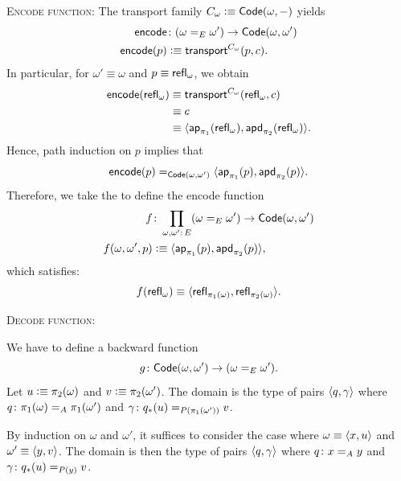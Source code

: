 \textsc{Encode function:}
The transport family\/ $C_\omega\mathrel{\vcentcolon}\equiv\mathsf{Code}(\omega,{\mathord-})$ yields
\begin{align*}
    \fun{encode}&\colon(\omega\eq{E}\omega') \to \fun{Code}(\omega,\omega')\\
    \fun{encode}(p) &\defeq \fun{transport}^{C_\omega}(p, c).
\end{align*}
In particular, for $\omega'\equiv\omega$ and $p\equiv\mathsf{refl}_\omega$, we obtain
\begin{align*}
    \mathsf{encode}(\mathsf{refl}_\omega)
        &\equiv\mathsf{transport}^{C_\omega}(\mathsf{refl}_\omega,c)\\
        &\equiv c\\
        &\equiv\langle\mathsf{ap}_{\pi_1}(\mathsf{refl}_\omega)
            ,\mathsf{apd}_{\pi_2}(\mathsf{refl}_\omega)\rangle.
\end{align*}
Hence, path induction on $p$ implies that
\[
    \mathsf{encode}(p)\mathrel{=_{\mathsf{Code}(\omega,\omega')}}
        \langle
            \mathsf{ap}_{\pi_1}(p),\mathsf{apd}_{\pi_2}(p)
        \rangle.
\]
Therefore, we take the \rhs to define the encode function
\begin{align*}
        f&\colon\prod_{\omega,\omega'\colon E}
            (\omega\eq E\omega')
            \to\fun{Code}(\omega,\omega')\\
        f(\omega,\omega',p)&\defeq
            \dep{
                \fun{ap}_{\pi_1}(p),\fun{apd}_{\pi_2}(p)
            },
    \end{align*}
which satisfies:
\[
    f(\mathsf{refl}_\omega)\equiv
        \langle
            \mathsf{refl}_{\pi_1(\omega)},
            \mathsf{refl}_{\pi_2(\omega)}
        \rangle.
\]  

\textsc{Decode function:}

We have to define a backward function
\[
    g\colon\fun{Code}(\omega,\omega')\to(\omega\eq E\omega').
\]
Let $u\mathrel{\vcentcolon}\equiv\pi_2(\omega)$ and $v\mathrel{\vcentcolon}\equiv\pi_2(\omega')$. The domain is the type of pairs $\langle q,\gamma\rangle$ where $q\colon\pi_1(\omega)\eq A\pi_1(\omega')$ and $\gamma\colon q_*(u)\eq{P(\pi_1(\omega'))}v$.

By induction on $\omega$ and $\omega'$, it suffices to consider the case where $\omega\equiv\langle x,u\rangle$ and $\omega'\equiv\langle y,v\rangle$. The domain is then the type of pairs $\langle q,\gamma\rangle$ where $q\colon x\eq Ay$ and $\gamma\colon q_*(u)\eq{P(y)}v$.
    

